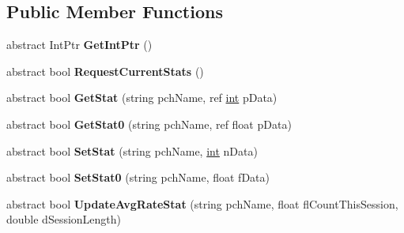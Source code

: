 \subsection*{Public Member Functions}
\begin{DoxyCompactItemize}
\item 
\hypertarget{classValve_1_1Steamworks_1_1ISteamUserStats_a3621588873bf66cd0403eb0878f7fcc4}{}abstract Int\+Ptr {\bfseries Get\+Int\+Ptr} ()\label{classValve_1_1Steamworks_1_1ISteamUserStats_a3621588873bf66cd0403eb0878f7fcc4}

\item 
\hypertarget{classValve_1_1Steamworks_1_1ISteamUserStats_a28f9fa84c093d35eb1783611ec94121a}{}abstract bool {\bfseries Request\+Current\+Stats} ()\label{classValve_1_1Steamworks_1_1ISteamUserStats_a28f9fa84c093d35eb1783611ec94121a}

\item 
\hypertarget{classValve_1_1Steamworks_1_1ISteamUserStats_a82d9c2f62510e7507735aa333bbb51d9}{}abstract bool {\bfseries Get\+Stat} (string pch\+Name, ref \hyperlink{SDL__thread_8h_a6a64f9be4433e4de6e2f2f548cf3c08e}{int} p\+Data)\label{classValve_1_1Steamworks_1_1ISteamUserStats_a82d9c2f62510e7507735aa333bbb51d9}

\item 
\hypertarget{classValve_1_1Steamworks_1_1ISteamUserStats_ac901df195e03ac6ed71c2ab8d551e4df}{}abstract bool {\bfseries Get\+Stat0} (string pch\+Name, ref float p\+Data)\label{classValve_1_1Steamworks_1_1ISteamUserStats_ac901df195e03ac6ed71c2ab8d551e4df}

\item 
\hypertarget{classValve_1_1Steamworks_1_1ISteamUserStats_abc97a34ac155b2a5ff6b066eab992b12}{}abstract bool {\bfseries Set\+Stat} (string pch\+Name, \hyperlink{SDL__thread_8h_a6a64f9be4433e4de6e2f2f548cf3c08e}{int} n\+Data)\label{classValve_1_1Steamworks_1_1ISteamUserStats_abc97a34ac155b2a5ff6b066eab992b12}

\item 
\hypertarget{classValve_1_1Steamworks_1_1ISteamUserStats_ab97586fda86fb6e33a51ca313a1b6edb}{}abstract bool {\bfseries Set\+Stat0} (string pch\+Name, float f\+Data)\label{classValve_1_1Steamworks_1_1ISteamUserStats_ab97586fda86fb6e33a51ca313a1b6edb}

\item 
\hypertarget{classValve_1_1Steamworks_1_1ISteamUserStats_a491ab44f36b878361ffe70b77e473065}{}abstract bool {\bfseries Update\+Avg\+Rate\+Stat} (string pch\+Name, float fl\+Count\+This\+Session, double d\+Session\+Length)\label{classValve_1_1Steamworks_1_1ISteamUserStats_a491ab44f36b878361ffe70b77e473065}


\end{DoxyCompactItemize}
